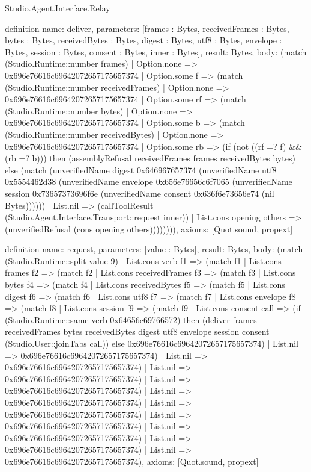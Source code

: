 \begin{lexlean}{Studio.Agent.Interface.Relay}
\begin{semanticmodule}
definition{
  name: deliver,
  parameters: [frames : Bytes, receivedFrames : Bytes, bytes : Bytes, receivedBytes : Bytes, digest : Bytes, utf8 : Bytes, envelope : Bytes, session : Bytes, consent : Bytes, inner : Bytes],
  result: Bytes,
  body: (match (Studio.Runtime::number frames)
    | Option.none => 0x696e76616c69642072657175657374
    | Option.some f => (match (Studio.Runtime::number receivedFrames)
      | Option.none => 0x696e76616c69642072657175657374
      | Option.some rf => (match (Studio.Runtime::number bytes)
        | Option.none => 0x696e76616c69642072657175657374
        | Option.some b => (match (Studio.Runtime::number receivedBytes)
          | Option.none => 0x696e76616c69642072657175657374
          | Option.some rb => (if (not ((rf =? f) && (rb =? b))) then (assemblyRefusal receivedFrames frames receivedBytes bytes) else (match (unverifiedName digest 0x646967657374 (unverifiedName utf8 0x5554462d38 (unverifiedName envelope 0x656e76656c6f7065 (unverifiedName session 0x73657373696f6e (unverifiedName consent 0x636f6e73656e74 (nil Bytes))))))
            | List.nil => (callToolResult (Studio.Agent.Interface.Transport::request inner))
            | List.cons opening others => (unverifiedRefusal (cons opening others)))))))),
  axioms: [Quot.sound, propext]
}

definition{
  name: request,
  parameters: [value : Bytes],
  result: Bytes,
  body: (match (Studio.Runtime::split value 9)
    | List.cons verb f1 => (match f1
      | List.cons frames f2 => (match f2
        | List.cons receivedFrames f3 => (match f3
          | List.cons bytes f4 => (match f4
            | List.cons receivedBytes f5 => (match f5
              | List.cons digest f6 => (match f6
                | List.cons utf8 f7 => (match f7
                  | List.cons envelope f8 => (match f8
                    | List.cons session f9 => (match f9
                      | List.cons consent call => (if (Studio.Runtime::same verb 0x64656c69766572) then (deliver frames receivedFrames bytes receivedBytes digest utf8 envelope session consent (Studio.User::joinTabs call)) else 0x696e76616c69642072657175657374)
                      | List.nil => 0x696e76616c69642072657175657374)
                    | List.nil => 0x696e76616c69642072657175657374)
                  | List.nil => 0x696e76616c69642072657175657374)
                | List.nil => 0x696e76616c69642072657175657374)
              | List.nil => 0x696e76616c69642072657175657374)
            | List.nil => 0x696e76616c69642072657175657374)
          | List.nil => 0x696e76616c69642072657175657374)
        | List.nil => 0x696e76616c69642072657175657374)
      | List.nil => 0x696e76616c69642072657175657374)
    | List.nil => 0x696e76616c69642072657175657374),
  axioms: [Quot.sound, propext]
}


\end{semanticmodule}
\end{lexlean}
